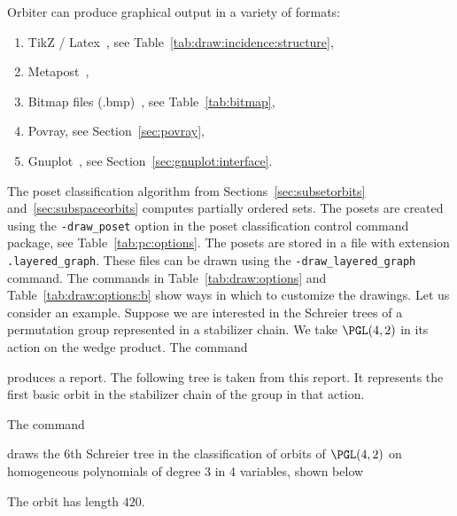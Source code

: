 Orbiter can produce graphical output in a variety of formats:
\begin{enumerate}
\item
TikZ / Latex~\cite{tantau:2022}, see Table~\ref{tab:draw:incidence:structure},
\item
Metapost~\cite{metapost2010},
\item
Bitmap files (.bmp)~\cite{bitmap}, see Table~\ref{tab:bitmap},
\item
Povray, see Section~\ref{sec:povray},
\item
Gnuplot~\cite{gnuplot}, see Section~\ref{sec:gnuplot:interface}.
\end{enumerate}


\bigskip



The poset classification algorithm from Sections~\ref{sec:subsetorbits} 
and~\ref{sec:subspaceorbits} computes partially ordered sets. 
The posets are created using the \verb'-draw_poset' option in 
the poset classification control command package, see Table~\ref{tab:pc:options}. 
The posets are stored in a file with extension \verb'.layered_graph'.
These files can be drawn using the \verb'-draw_layered_graph' command.
The commands in Table~\ref{tab:draw:options} and Table~\ref{tab:draw:options:b} 
show ways in which to customize the drawings.
Let us consider an example. 
Suppose we are interested in the Schreier trees 
of a permutation group represented in a stabilizer chain.
We take $\PGL(4,2)$ in its action on the wedge product.
The command


produces a report.
The following tree is taken from this report. It represents the  
first basic orbit 
in the stabilizer chain of the group in that action.



\bigskip



The command 


draws the $6$th Schreier tree in the classification of orbits of $\PGL(4,2)$ on 
homogeneous polynomials of degree 3 in 4 variables, 
shown below


The orbit has length $420.$ 

\bigskip


